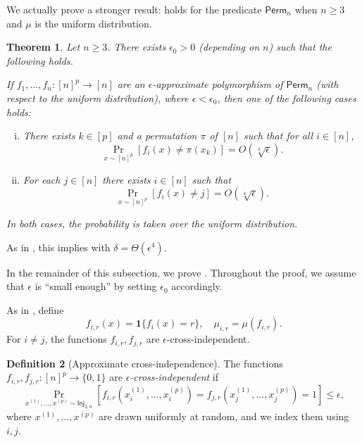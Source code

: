 \documentclass{article}
\providecommand{\Inj}{\mathsf{Inj}}
\providecommand{\Perm}{\mathsf{Perm}}
\providecommand{\ind}[1]{\mathbf1\{#1\}}
\newtheorem{theorem}{Theorem}[section]
\theoremstyle{definition}
\newtheorem{definition}[theorem]{Definition}
\theoremstyle{remark}
\begin{document}
We actually prove a stronger result:  holds for the predicate $\Perm_n$ when $n \ge 3$ and $\mu$ is the uniform distribution.

\begin{theorem}
\label{thm:filmus-Perm}
Let $n \ge 3$. There exists $\epsilon_0 > 0$ (depending on $n$) such that the following holds.

If $f_1,\dots,f_n\colon [n]^p \to [n]$ are an $\epsilon$-approximate polymorphism of $\Perm_n$ (with respect to the uniform distribution), where $\epsilon < \epsilon_0$, then one of the following cases holds:
\begin{enumerate}[(i)]
\item There exists $k \in [p]$ and a permutation $\pi$ of $[n]$ such that for all $i \in [n]$,
\label{itm:filmus-Perm-dict}
\[
 \Pr_{x \sim [n]^p}[f_i(x) \neq \pi(x_k)] = O(\sqrt[4]{\epsilon}).
\]
\item For each $j \in [n]$ there exists $i \in [n]$ such that
\label{itm:filmus-Perm-const}
\[
 \Pr_{x \sim [n]^p}[f_i(x) \neq j] = O(\sqrt[4]{\epsilon}).
\]
\end{enumerate}
In both cases, the probability is taken over the uniform distribution.
\end{theorem}

As in , this implies  with $\delta = \Theta(\epsilon^4)$.

In the remainder of this subsection, we prove .
Throughout the proof, we assume that $\epsilon$ is ``small enough'' by setting $\epsilon_0$ accordingly.

\smallskip

As in , define
\[
 f_{i,r}(x) = \ind{f_i(x) = r}, \quad \mu_{i,r} = \mu(f_{i,r}).
\]
For $i \neq j$, the functions $f_{i,r},f_{j,r}$ are $\epsilon$-cross-independent.

\begin{definition}[Approximate cross-independence]
\label{def:approx-cross-independent}
The functions $f_{i,r},f_{j,r}\colon [n]^p \to \{0,1\}$ are \emph{$\epsilon$-cross-independent} if
\[
 \Pr_{x^{(1)},\dots,x^{(p)} \sim \Inj_{2,n}}[f_{i,r}(x^{(1)}_i,\dots,x^{(p)}_i) = f_{j,r}(x^{(1)}_j,\dots,x^{(p)}_j) = 1] \leq \epsilon,
\]
where $x^{(1)},\dots,x^{(p)}$ are drawn uniformly at random, and we index them using $i,j$.
\end{definition}
\end{document}

